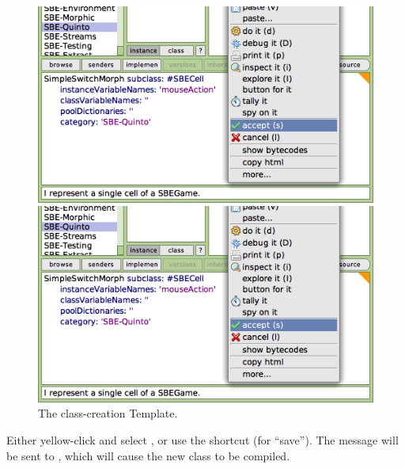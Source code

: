 \documentclass[a4paper,10pt,twoside]{book}
\begin{document}
\begin{figure}[h!t]
\ifluluelse
	{\centerline {\includegraphics[width=\textwidth]{AcceptClassDef}}}
	{\centerline {\includegraphics[scale=0.7]{AcceptClassDef}}}
\caption{The class-creation Template.
\label{fig:acceptClassDef}}
\end{figure}

Either yellow-click and select , or use the shortcut  (for ``save'').
The message will be sent to , which will cause the new class to be compiled.
\end{document}

